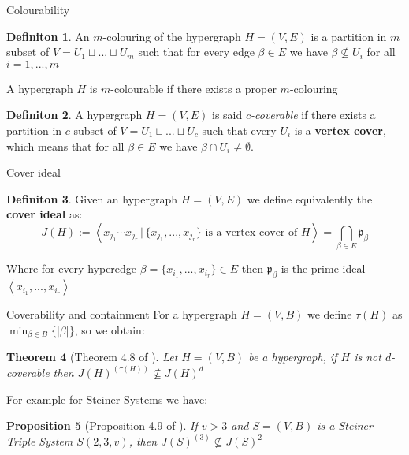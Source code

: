 \documentclass{beamer}
\theoremstyle{plain}
\newtheorem{teo}{Theorem}[section]
\newtheorem{prop}[teo]{Proposition}
\theoremstyle{remark}
\theoremstyle{definition}
\newtheorem{deff}[teo]{Definiton}
\newcommand{\p}{\mathfrak{p}}
\begin{document}
\begin{frame}{Colourability}
\begin{deff}
An $ m $-colouring of the hypergraph $ H = (V,E) $ is a partition in $ m $ subset of $ V = U_1 \sqcup ... \sqcup U_m $ such that for every edge $ \beta \in E $ we have $ \beta \not \subseteq U_i $ for all $ i = 1, ... , m $
\end{deff}

A hypergraph $ H $ is $ m $-colourable if there exists a proper $ m $-colouring
 \pause


\begin{deff} \label{def:cover}
A hypergraph $ H = (V,E) $ is said \textit{$ c $-coverable} if there exists a partition in $ c $ subset of $ V = U_1 \sqcup ... \sqcup U_c $ such that every $ U_i $ is a \textbf{vertex cover}, which means  that for all $ \beta \in E $ we have $ \beta \cap U_i \neq \emptyset $.
\end{deff}
\end{frame}

\begin{frame}{Cover ideal}
\begin{deff}
Given an hypergraph $ H = (V,E) $ we define equivalently the \textbf{cover ideal} as:
\begin{equation*}
J(H) := \left\langle x_{j_1} \cdots x_{j_r} \,|\, \{ x_{j_1} , ... , x_{j_r}\} \text{ is a vertex cover of } H \right\rangle  = \bigcap_{\beta \in E} \p_\beta
\end{equation*}
\end{deff}
Where for every hyperedge $ \beta = \{ x_{i_1} , ... , x_{i_r}\} \in E  $ then $ \p_\beta $ is the prime ideal $ \left\langle  x_{i_1} , ... , x_{i_r} \right\rangle  $
\end{frame}


\begin{frame}{Coverability and containment}
For a hypergraph $ H = (V,B) $ we define $ \tau (H) $ as $ \min_{\beta \in B} \{ |\beta |\}$, so we obtain:
\begin{teo}[Theorem 4.8 of \cite{Bal21Steiner}] \label{teo:col:cont}
Let $ H = (V,B) $ be a hypergraph, if $ H $ is not $ d $-coverable then $ J(H)^{(\tau(H))} \not \subseteq J(H)^d $
\end{teo}
For example for Steiner Systems we have:
\begin{prop}[Proposition 4.9 of \cite{Bal21Steiner}]
If $ v>3 $ and $ S = (V,B) $ is a Steiner Triple System $ S(2,3,v) $, then $ J(S)^{(3)}  \not \subseteq J(S)^2$
\end{prop}
\end{frame}
\end{document}
